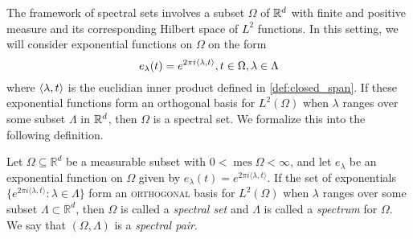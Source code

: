\documentclass[../thesis.tex]{subfiles}
\begin{document}







The framework of spectral sets involves a subset $\Omega$ of $\mathbb{R}^d$ with finite and positive measure and its corresponding Hilbert space of $L^2$ functions. In this setting, we will consider exponential functions on $\Omega$ on the form 
\begin{equation}\label{eq:exp}
    e_{\lambda}(t) = e^{2 \pi i \langle \lambda, t \rangle}, t\in \Omega, \lambda \in \Lambda
\end{equation}
where $\langle \lambda, t \rangle$ is the euclidian inner product defined in \cref{def:closed_span}. If these exponential functions form an orthogonal basis for $L^2(\Omega)$ when $\lambda$ ranges over some subset $\Lambda$ in $\mathbb{R}^d$, then $\Omega$ is a spectral set. We formalize this into the following definition.

\begin{definition} \label{def:spectral_set}
    Let $\Omega \subseteq \mathbb{R}^d$ be a measurable subset with $0< \operatorname{mes} \Omega < \infty$, and let $e_{\lambda}$ be an exponential function on $\Omega$ given by $e_{\lambda}(t) = e^{2\pi i \langle \lambda,t  \rangle }$. If the set of exponentials $\{ e^{2\pi i \langle \lambda,t  \rangle } : \lambda \in \Lambda\}$  form an \textsc{orthogonal} basis for $L^2 (\Omega)$ when $\lambda$ ranges over some subset $\Lambda \subset \mathbb{R}^d$, then $\Omega$ is called a \emph{spectral set} and $\Lambda$ is called a \emph{spectrum} for $\Omega$. We say that $(\Omega, \Lambda)$ is a \emph{spectral pair}. 
\end{definition}
\end{document}
